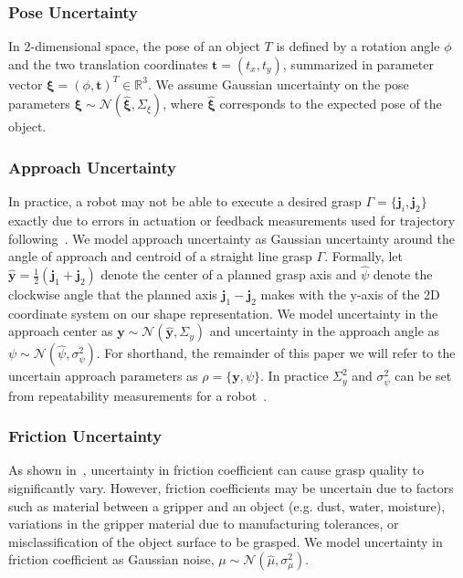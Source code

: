 \documentclass[10pt, conference]{ieeeconf}      %
\newcommand{\bj}{\mathbf{j}}
\newcommand{\bt}{\mathbf{t}}
\newcommand{\by}{\mathbf{y}}
\newcommand{\mN}{\mathcal{N}}
\begin{document}
\subsubsection{Pose Uncertainty}
In 2-dimensional space, the pose of an object $T$ is defined by a rotation angle $\phi$ and the two translation coordinates $\bt = (t_x, t_y)$, summarized in parameter vector $\mathbf{\xi} = (\phi, \bt)^T \in \mathbb{R}^3$.  We assume Gaussian uncertainty on the pose parameters $\mathbf{\xi} \sim \mN \left( \hat{\mathbf{\xi}}, \Sigma_{\xi} \right)$, where $\hat{\mathbf{\xi}}$ corresponds to the expected pose of the object. 

 
 \subsubsection{Approach Uncertainty}
In practice, a robot may not be able to execute a desired grasp $\Gamma = \lbrace \bj_i,\bj_2\rbrace$ exactly due to errors in actuation or feedback measurements used for trajectory following~\cite{kehoe2012estimating}.
We model approach uncertainty as Gaussian uncertainty around the angle of approach and centroid of a straight line grasp $\Gamma$.
Formally, let $\hat{\by} = \frac{1}{2} (\bj_1 + \bj_2)$ denote the center of a planned grasp axis and $\hat{\psi}$ denote the clockwise angle that the planned axis $\bj_1 - \bj_2$ makes with the y-axis of the 2D coordinate system on our shape representation.
We model uncertainty in the approach center as $\by \sim \mN(\hat{\by}, \Sigma_y)$ and uncertainty in the approach angle as $\psi \sim \mN(\hat{\psi}, \sigma_{\psi}^2)$.
For shorthand, the remainder of this paper we will refer to the uncertain approach parameters as $\rho = \{\by, \psi \}$.
In practice $\Sigma_{y}^2$ and $\sigma_{\psi}^2$ can be set from repeatability measurements for a robot~\cite{mooring1986determination}.

 \subsubsection{Friction Uncertainty}
As shown in~\cite{zheng2005,hang2013a}, uncertainty in friction coefficient can cause grasp quality to significantly vary.
However, friction coefficients may be uncertain due to factors such as material between a gripper and an object (e.g. dust, water, moisture), variations in the gripper material due to manufacturing tolerances, or misclassification of the object surface to be grasped.
We model uncertainty in friction coefficient as Gaussian noise, $\mu \sim \mN(\hat{\mu},\sigma_{\mu}^2)$.
\end{document}
